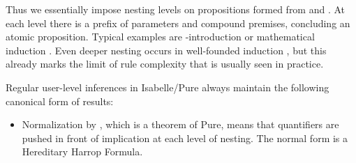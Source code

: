 \begin{isabellebody}
\begin{isamarkuptext}
  Thus we essentially impose nesting levels on propositions formed
  from  and .  At each level there is a prefix
  of parameters and compound premises, concluding an atomic
  proposition.  Typical examples are -introduction  or mathematical induction .  Even deeper nesting occurs in well-founded
  induction , but this
  already marks the limit of rule complexity that is usually seen in
  practice.

  \medskip Regular user-level inferences in Isabelle/Pure always
  maintain the following canonical form of results:

  \begin{itemize}

  \item Normalization by ,
  which is a theorem of Pure, means that quantifiers are pushed in
  front of implication at each level of nesting.  The normal form is a
  Hereditary Harrop Formula.


\end{itemize}
\end{isamarkuptext}
\end{isabellebody}
